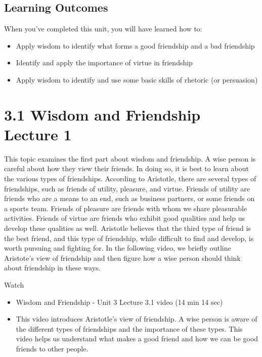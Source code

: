 \documentclass[
]{book}
\providecommand{\tightlist}{%
  \setlength{\itemsep}{0pt}\setlength{\parskip}{0pt}}
\begin{document}
\hypertarget{learning-outcomes-2}{%
\subsection*{Learning Outcomes}\label{learning-outcomes-2}}

When you've completed this unit, you will have learned how to:

\begin{itemize}
\tightlist
\item
  Apply wisdom to identify what forms a good friendship and a bad friendship
\item
  Identify and apply the importance of virtue in friendship
\item
  Apply wisdom to identify and use some basic skills of rhetoric (or persuasion)
\end{itemize}

\hypertarget{wisdom-and-friendship-lecture-1}{%
\section*{3.1 Wisdom and Friendship Lecture 1}\label{wisdom-and-friendship-lecture-1}}

This topic examines the first part about wisdom and friendship. A wise person is careful about how they view their friends. In doing so, it is best to learn about the various types of friendships. According to Aristotle, there are several types of friendships, such as friends of utility, pleasure, and virtue. Friends of utility are friends who are a means to an end, such as business partners, or some friends on a sports team. Friends of pleasure are friends with whom we share pleasurable activities. Friends of virtue are friends who exhibit good qualities and help us develop these qualities as well. Aristotle believes that the third type of friend is the best friend, and this type of friendship, while difficult to find and develop, is worth pursuing and fighting for. In the following video, we briefly outline Aristote's view of friendship and then figure how a wise person should think about friendship in these ways.

Watch

\begin{itemize}
\tightlist
\item
  Wisdom and Friendship - Unit 3 Lecture 3.1 video (14 min 14 sec)
\item
  This video introduces Aristotle's view of friendship. A wise person is aware of the different types of friendships and the importance of these types. This video helps us understand what makes a good friend and how we can be good friends to other people.
\end{itemize}
\end{document}
